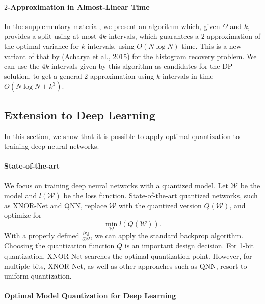 \documentclass{article}
\begin{document}
\vspace{-0.5em}
\paragraph*{$2$-Approximation in Almost-Linear Time} 
In the supplementary material, we present an algorithm which, given $\Omega$ and $k$, provides a split using at most $4 k$ intervals, which guarantees a $2$-approximation of the optimal variance for $k$ intervals, using $O( N \log N )$ time. This 
is a new variant of that by (Acharya et al., 2015) for the histogram recovery problem. 
We can use the $4k$ intervals given by this algorithm as candidates for the DP solution, to get a general $2$-approximation using $k$ intervals in time $O( N \log N + k^3)$. 

\vspace{-1.0em}
\subsection{Extension to Deep Learning}
\vspace{-0.5em}

In this section, we show that it is possible 
to apply optimal quantization to
training deep neural networks.

\vspace{-0.5em}
\paragraph*{State-of-the-art} We focus on
training deep neural networks with a quantized
model. Let $\mathcal{W}$ be the model and 
$l(\mathcal{W})$ be the loss function. State-of-the-art quantized networks,
such as XNOR-Net and QNN, replace $\mathcal{W}$
with the quantized version $Q(\mathcal{W})$, and optimize
for
\[
\min_{\mathcal{W}} l(Q(\mathcal{W})).
\]
With a properly defined 
$\frac{\partial Q}{\partial{\mathcal{W}}}$, we can
apply the standard backprop 
algorithm.
Choosing the quantization function $Q$ is
an important design decision. For 1-bit quantization,
XNOR-Net searches the optimal quantization point. However, for multiple bits,
XNOR-Net, as well as other approaches such as QNN, resort
to uniform quantization.

\vspace{-1.0em}
\paragraph*{Optimal Model Quantization for Deep Learning}
\end{document}
